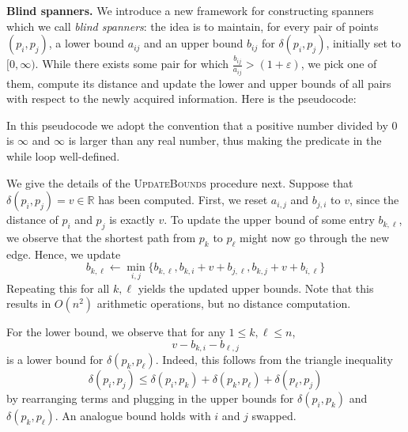 \documentclass[a4paper,UKenglish,cleveref, autoref]{lipics-v2019}
\newcommand{\R}{\mathbb{R}}
\newcommand{\eps}{\varepsilon}
\newcommand{\dist}{\delta}
\newcommand{\myparagraph}[1]{\textbf{#1.}}
\begin{document}
\myparagraph{Blind spanners}
%
We introduce a new framework for constructing spanners
which we call \emph{blind spanners}: the idea is to maintain,
for every pair of points $(p_i,p_j)$,
a lower bound $a_{ij}$ and an upper bound $b_{ij}$ for $\dist(p_i,p_j)$,
initially set to $[0,\infty)$. While there exists some pair for which $\frac{b_{ij}}{a_{ij}}>(1+\eps)$,
we pick one of them, compute its distance and update the lower and upper bounds of
all pairs with respect to the newly acquired information. Here is the pseudocode:

\begin{algorithmic}
\label{alg:blind_spanner}
\Function{BlindSpanner}{$P, \eps$}
    \While {$\exists i \neq j : b_{i,j} / a_{i,j} > 1 + \eps$}
     
    \State {$v \gets \dist(p_i, pj)$}
    \State {}
    \EndWhile
\EndFunction
\end{algorithmic}


In this pseudocode we adopt the convention that a positive number divided by 0 is $\infty$
and $\infty$ is larger than any real number,
thus making the predicate in the while loop well-defined.  

We give the details of the \textsc{UpdateBounds} procedure next.
Suppose that
$\dist(p_i,p_j)=v\in\R$ has been computed.
First, we reset $a_{i,j}$ and $b_{j,i}$ to $v$, since the distance
of $p_i$ and $p_j$ is exactly $v$.
To update the upper bound of some entry $b_{k,\ell}$,
we observe that the shortest path from $p_k$ to $p_\ell$ might now
go through the new edge. Hence, we update
\[
    b_{k,\ell}\gets \min_{i,j}\{b_{k,\ell},b_{k,i}+v+b_{j,\ell},b_{k,j}+v+b_{i,\ell}\}
\]
Repeating this for all $k,\ell$ yields the updated upper bounds.
Note that this results in $O(n^2)$ arithmetic operations,
but no distance computation.

For the lower bound, we observe that for any $1\leq k,\ell\leq n$,
\[
    v-b_{k,i}-b_{\ell,j}
\]
is a lower bound for $\dist(p_k,p_\ell)$. Indeed, this follows from
the triangle inequality
%
\[\dist(p_i,p_j)\leq \dist(p_i,p_k)+\dist(p_k,p_\ell)+\dist(p_\ell,p_j)\]
by rearranging terms and plugging in the upper bounds for $\dist(p_i,p_k)$
and $\dist(p_k,p_\ell)$. An analogue bound holds with $i$ and $j$ swapped. 
\end{document}
